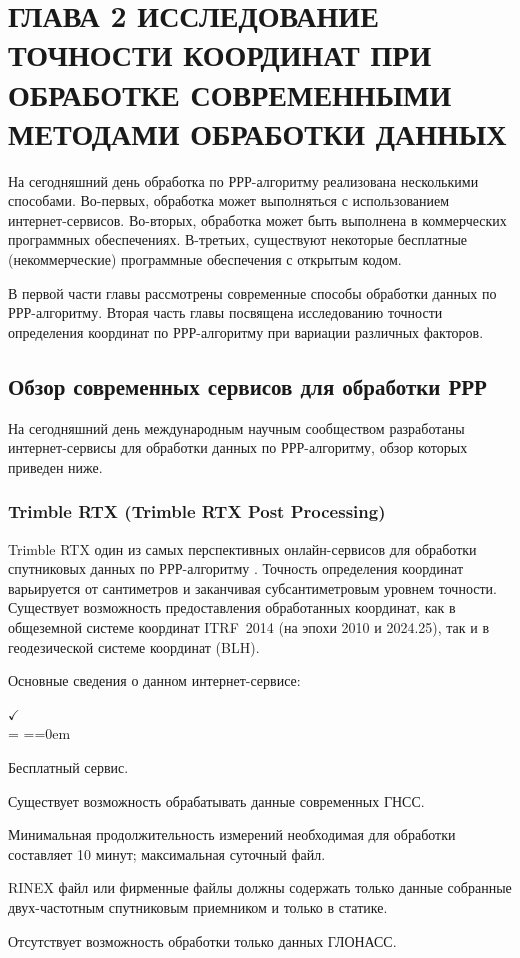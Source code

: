 \chapter{ГЛАВА 2 ИССЛЕДОВАНИЕ ТОЧНОСТИ КООРДИНАТ ПРИ ОБРАБОТКЕ СОВРЕМЕННЫМИ МЕТОДАМИ ОБРАБОТКИ ДАННЫХ }\label{ch:ch2}

На сегодняшний день обработка по РРР-алгоритму реализована несколькими способами. Во-первых, обработка может выполняться с использованием интернет-сервисов. Во-вторых, обработка может быть выполнена в коммерческих программных обеспечениях. В-третьих, существуют некоторые бесплатные (некоммерческие) программные обеспечения с открытым кодом.

В первой части главы рассмотрены современные способы обработки данных по РРР-алгоритму. Вторая часть главы посвящена исследованию точности определения координат по РРР-алгоритму при вариации различных факторов.

\section{Обзор современных сервисов для обработки РРР}\label{sec:ch2/sec1}

На сегодняшний день международным научным сообществом разработаны интернет-сервисы для обработки данных по РРР-алгоритму, обзор которых приведен ниже.

\subsection{Trimble RTX (Trimble RTX Post Processing)}\label{subsec:ch2/sec1/sub1}

Trimble RTX один из самых перспективных онлайн-сервисов для обработки спутниковых данных по РРР-алгоритму \cite{src81}. Точность определения координат варьируется от сантиметров и заканчивая субсантиметровым уровнем точности. Существует возможность предоставления обработанных координат, как в общеземной системе координат ITRF~2014 (на эпохи 2010 и 2024.25), так и в геодезической системе координат (BLH).

Основные сведения о данном интернет-сервисе: 
\begin{list}{$ \checkmark $\\[6pt]} {\parsep = \parskip \itemsep=\parsep \topsep=0em}
	\item Бесплатный сервис. 
	\item Существует возможность обрабатывать данные современных ГНСС.
	\item Минимальная продолжительность измерений необходимая для обработки составляет 10 минут; максимальная суточный файл.
	\item RINEX файл или фирменные файлы должны содержать только данные собранные двух-частотным спутниковым приемником и только в статике.
	\item Отсутствует возможность обработки только данных ГЛОНАСС.
\end{list}

